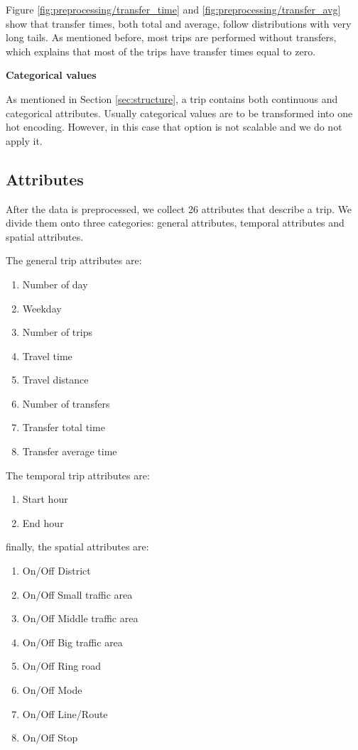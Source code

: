 \documentclass{article}
\begin{document}
Figure \ref{fig:preprocessing/transfer_time} and \ref{fig:preprocessing/transfer_avg} show that transfer times, both total and average, follow distributions with very long tails. As mentioned before, most trips are performed without transfers, which explains that most of the trips have transfer times equal to zero. %

\textbf{Categorical values}

As mentioned in Section \ref{sec:structure}, a trip contains both continuous and categorical attributes. Usually categorical values are to be transformed into one hot encoding. However, in this case that option is not scalable and we do not apply it.


\subsection{Attributes}
\label{sec:attributes}
After the data is preprocessed, we collect 26 attributes that describe a trip. We divide them onto three categories: general attributes, temporal attributes and spatial attributes. 

The general trip attributes are: 

\begin{enumerate}
\item Number of day
\item Weekday
\item Number of trips
\item Travel time
\item Travel distance
\item Number of transfers
\item Transfer total time
\item Transfer average time
\end{enumerate}

The temporal trip attributes are:
 
\begin{enumerate}
\item Start hour
\item End hour
\end{enumerate}

finally, the spatial attributes are:

\begin{enumerate}
\item On/Off District
\item On/Off Small traffic area
\item On/Off Middle traffic area
\item On/Off Big traffic area
\item On/Off Ring road
\item On/Off Mode
\item On/Off Line/Route
\item On/Off Stop
\end{enumerate}
\end{document}
